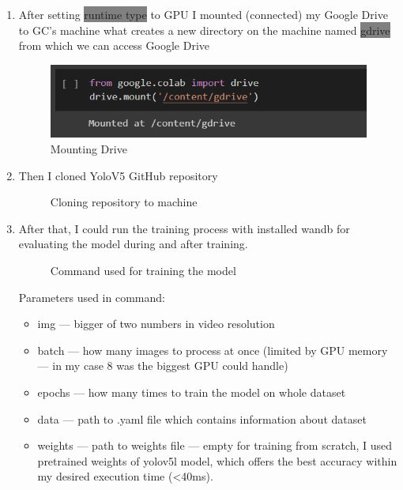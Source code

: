 \begin{enumerate}
    \item After setting \colorbox{Gray}{runtime type} to GPU I mounted (connected) my Google Drive to GC's machine what creates a new directory on the machine named \colorbox{Gray}{gdrive} from which we can access Google Drive
    \newline \begin{figure} [h]
        \centering
        \includegraphics{images/train1}
        \caption{Mounting Drive}
        \label{fig:train1}
    \end{figure}
    \item Then I cloned YoloV5 GitHub repository
    \newline \begin{figure} [h]
        \centering
        \caption{Cloning repository to machine}
        \label{fig:train2}
    \end{figure}
    \item After that, I could run the training process with installed wandb for evaluating the model during and after training.
    \newline \begin{figure} [h]
        \centering
        \caption{Command used for training the model}
        \label{fig:train3}
    \end{figure}
    \newline Parameters used in command:
    \begin{itemize}
        \item img --- bigger of two numbers in video resolution
        \item batch --- how many images to process at once (limited by GPU memory --- in my case 8 was the biggest GPU could handle)
        \item epochs --- how many times to train the model on whole dataset
        \item data --- path to .yaml file which contains information about dataset
        \item weights --- path to weights file --- empty for training from scratch, I used pretrained weights of yolov5l model, which offers the best accuracy within my desired execution time (<40ms).
    \end{itemize}
\end{enumerate}

